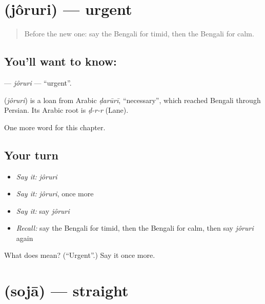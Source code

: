 \section[\texorpdfstring{\bn{জরুরি} (jôruri)}{জরুরি (jôruri)}]{ (jôruri) — urgent}

\label{lesson:BN-C139-joruri}



\begin{quote}
Before the new one: say the Bengali for timid, then the Bengali for calm.
\end{quote}

\subsection*{You'll want to know: }
\textbf{} — \emph{jôruri} — \textquotedblleft{}urgent\textquotedblright{}.

\begin{cousinweb}
\textbf{} (\emph{jôruri}) is a loan from Arabic \emph{ḍarūrī}, \textquotedblleft{}necessary\textquotedblright{}, which reached Bengali through Persian. Its Arabic root is \emph{ḍ-r-r} (Lane).
\end{cousinweb}

\begin{grammarlens}[title={What you've built}]
One more word for this chapter.
\end{grammarlens}

\subsection*{Your turn}
\begin{itemize}
\raggedright
  \item \emph{Say it:} \emph{jôruri}
  \item \emph{Say it:} \emph{jôruri}, once more
  \item \emph{Say it:} say \emph{jôruri}
  \item \emph{Recall:} say the Bengali for timid, then the Bengali for calm, then say \emph{jôruri} again
\end{itemize}

\begin{tcolorbox}[breakable,colback=teal!4,colframe=teal!35!black,title={Before you move on}]
What does  mean? (\textquotedblleft{}Urgent\textquotedblright{}.) Say it once more.
\end{tcolorbox}
\section[\texorpdfstring{\bn{সোজা} (sojā)}{সোজা (sojā)}]{ (sojā) — straight}

